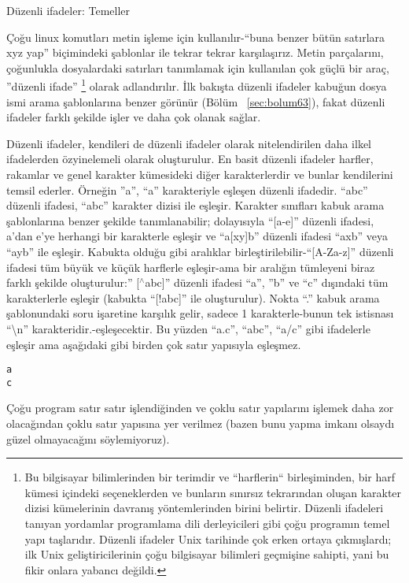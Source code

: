 \begin{section}{Düzenli ifadeler: Temeller} \label{sec:bolum71}

Çoğu linux komutları metin işleme için kullanılır-“buna benzer bütün satırlara xyz yap” biçimindeki şablonlar ile tekrar tekrar karşılaşırız. Metin parçalarını, çoğunlukla dosyalardaki satırları tanımlamak için kullanılan çok güçlü bir araç, ”düzenli ifade”
\footnote{Bu bilgisayar bilimlerinden bir terimdir ve “harflerin“ birleşiminden, bir harf kümesi içindeki seçeneklerden ve bunların sınırsız tekrarından oluşan karakter dizisi kümelerinin davranış yöntemlerinden birini belirtir. Düzenli ifadeleri tanıyan yordamlar programlama dili derleyicileri gibi çoğu programın temel yapı taşlarıdır. Düzenli ifadeler Unix tarihinde çok erken ortaya çıkmışlardı; ilk Unix geliştiricilerinin çoğu bilgisayar bilimleri geçmişine sahipti, yani bu fikir onlara yabancı değildi.} olarak adlandırılır. İlk bakışta düzenli ifadeler kabuğun dosya ismi arama şablonlarına benzer görünür (Bölüm ~\ref{sec:bolum63}), fakat düzenli ifadeler farklı şekilde işler ve daha çok olanak sağlar.

Düzenli ifadeler, kendileri de düzenli ifadeler olarak nitelendirilen daha ilkel ifadelerden özyinelemeli olarak oluşturulur. En basit düzenli ifadeler harfler, rakamlar ve genel karakter kümesideki diğer karakterlerdir ve bunlar kendilerini temsil ederler. Örneğin ”a”, “a” karakteriyle eşleşen düzenli ifadedir. “abc” düzenli ifadesi, “abc” karakter dizisi ile eşleşir. Karakter sınıfları kabuk arama şablonlarına benzer şekilde tanımlanabilir; dolayısıyla “[a-e]” düzenli ifadesi, a’dan e’ye herhangi bir karakterle eşleşir ve “a[xy]b” düzenli ifadesi “axb” veya “ayb” ile eşleşir. Kabukta olduğu gibi aralıklar birleştirilebilir-“[A-Za-z]” düzenli ifadesi tüm büyük ve küçük harflerle eşleşir-ama bir aralığın tümleyeni biraz farklı şekilde oluşturulur:” [$ ^\wedge $abc]” düzenli ifadesi  “a”, ”b” ve “c” dışındaki tüm karakterlerle eşleşir (kabukta “[!abc]” ile oluşturulur). Nokta “.” kabuk arama şablonundaki soru işaretine karşılık gelir, sadece 1 karakterle-bunun tek istisnası “\textbackslash n” karakteridir.-eşleşecektir. Bu yüzden “a.c”, “abc”, “a/c” gibi ifadelerle eşleşir ama aşağıdaki gibi birden çok satır yapısıyla eşleşmez.
\begin{verbatim}
a
c
\end{verbatim}

Çoğu program satır satır işlendiğinden  ve çoklu satır yapılarını işlemek daha zor olacağından çoklu satır yapısına yer verilmez (bazen bunu yapma imkanı olsaydı güzel olmayacağını söylemiyoruz).


\end{section}
